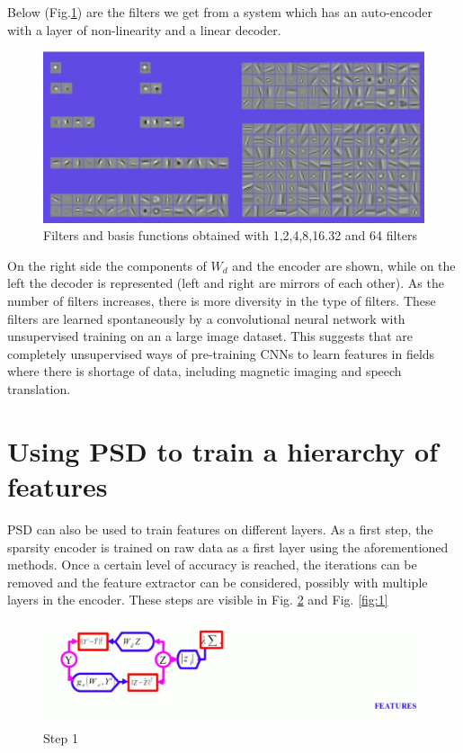 Below (Fig.\ref{fig:MultipleFilters}) are the filters we get from a system which has an auto-encoder with a layer of non-linearity and a linear decoder. 
\begin{figure}[H]
  \includegraphics[width=\linewidth]{figs/MultipleFilters.jpg}
  \caption{Filters and basis functions obtained with 1,2,4,8,16.32 and 64 filters}
  \label{fig:MultipleFilters}
\end{figure}
On the right side the components of $W_d$ and the encoder are shown, while on the left the decoder is represented (left and right are mirrors of each other). As the number of filters increases, there is more diversity in the type of filters. These filters are learned spontaneously by a convolutional neural network with unsupervised training on an a large image dataset. This suggests that are completely unsupervised ways of pre-training CNNs to learn features in fields where there is shortage of data, including magnetic imaging and speech translation.


\section{Using PSD to train a hierarchy of features}
PSD can also be used to train features on different layers. As a first step, the sparsity encoder is trained on raw data as a first layer using the aforementioned methods. Once a certain level of accuracy is reached, the iterations can be removed and the feature extractor can be considered, possibly with multiple layers in the encoder. These steps are visible in Fig. \ref{fig:0} and Fig. \ref{fig:1} 
\begin{figure}[h!]
  \includegraphics[width=\linewidth]{figs/sp_0.jpg}
  \caption{Step 1}
  \label{fig:0}
\end{figure}

